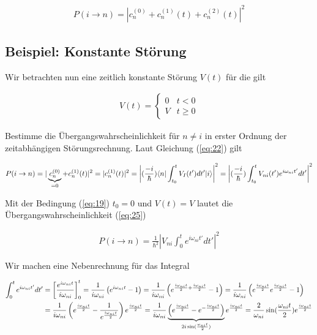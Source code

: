 \begin{align}
  \label{eq:22}
  \boxed{P(i\rightarrow n) = |c^{(0)}_n + c_n^{(1)}(t)+c_n^{(2)}(t)|^2}
\end{align}

\subsection*{Beispiel: Konstante Störung}

Wir betrachten nun eine zeitlich konstante Störung \(V(t)\) für die gilt

\begin{align}
  \label{eq:19}
  V(t) =\begin{cases}0& t<0\\ V&t\ge 0    \end{cases}
\end{align}

Bestimme die Übergangswahrscheinlichkeit für \(n \ne i\) in erster Ordnung der zeitabhängigen Störungsrechnung. Laut Gleichung (\ref{eq:22}) gilt

\begin{align}
  \label{eq:25}
  P(i\rightarrow n) = |\underbr{c^{(0)}_n}_{=0} + c_n^{(1)}(t)|^2 = |c_n^{(1)}(t)|^2 = \left|(\frac{-i}{\hbar})\langle n |\int_{t_0}^t V_I(t')dt'|i\rangle\right|^2 =   \left|(\frac{-i}{\hbar})\int_{t_0}^t V_{ni}(t')e^{i\omega_{ni}t'}dt'\right|^2
\end{align}

Mit der Bedingung (\ref{eq:19}) \(t_0=0\) und \(V(t)=V\) lautet die Übergangswahrscheinlichkeit (\ref{eq:25})

\begin{align}
  \label{eq:26}
  P(i\rightarrow n) = \frac{1}{\hbar^2}| V_{ni} \int_{0}^t e^{i\omega_{ni}t'}dt'|^2
\end{align}

Wir machen eine Nebenrechnung für das Integral

\begin{align}
  \label{eq:27}
  \int_{0}^t e^{i\omega_{ni}t'}dt' &= \left[ \frac{e^{i\omega_{ni} t}}{i\omega_{ni}}  \right]_0^t = \frac{1}{i\omega_{ni}}\left( e^{i\omega_{ni} t}-1 \right) = \frac{1}{i\omega_{ni}}\left( e^{\frac{i\omega_{ni} t}{2}+\frac{i\omega_{ni} t}{2}}-1 \right) =  \frac{1}{i\omega_{ni}}\left( e^{\frac{i\omega_{ni} t}{2}}e^{\frac{i\omega_{ni} t}{2}}-1 \right) \notag \\
&=  \frac{1}{i\omega_{ni}}\left( e^{\frac{i\omega_{ni} t}{2}}-\frac{1}{e^{\frac{i\omega_{ni} t}{2}}} \right)e^{\frac{i\omega_{ni} t}{2}} = \frac{1}{i\omega_{ni}} \underbr{\left( e^{\frac{i\omega_{ni} t}{2}}-e^{-\frac{i\omega_{ni} t}{2}}\right)}_{2i\sin(\frac{\omega_{ni} t}{2})} e^{\frac{i\omega_{ni} t}{2}} = \frac{2}{\omega_{ni}}\sin(\frac{\omega_{ni} t}{2})e^{\frac{i\omega_{ni} t}{2}}
\end{align}

